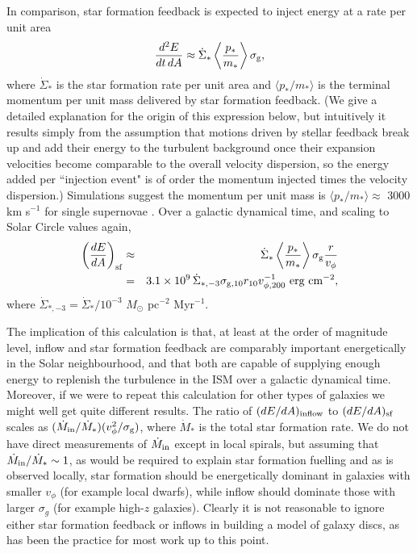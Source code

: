 \documentclass[useAMS,usenatbib]{mn2e}
\begin{document}
In comparison, star formation feedback is expected to inject energy at a rate per unit area 
\begin{equation}
\frac{d^2 E}{dt\, dA} \approx \dot{\Sigma}_* \left\langle \frac{p_*}{m_*}\right\rangle \sigma_{\rm g},
\end{equation}
where $\dot{\Sigma}_*$ is the star formation rate per unit area and $\langle p_*/m_*\rangle$ is the terminal momentum per unit mass delivered by star formation feedback. (We give a detailed explanation for the origin of this expression below, but intuitively it results simply from the assumption that motions driven by stellar feedback break up and add their energy to the turbulent background once their expansion velocities become comparable to the overall velocity dispersion, so the energy added per ``injection event" is of order the momentum injected times the velocity dispersion.)  Simulations suggest the momentum per unit mass is $\langle p_*/m_*\rangle \approx$ 3000 km s$^{-1}$ for single supernovae \citep{cioffi88a, thornton98a, martizzi15a, kim15a, walch15b, gentry17a, kim17a}. Over a galactic dynamical time, and scaling to Solar Circle values again,
\begin{eqnarray}
\left(\frac{dE}{dA}\right)_{\rm sf} & \approx & \dot{\Sigma}_* \left\langle \frac{p_*}{m_*}\right\rangle \sigma_{\rm g} \frac{r}{v_\phi}
\nonumber \\
& = & 3.1\times 10^9\, \dot{\Sigma}_{*,-3} \sigma_{\rm g,10} r_{10} v_{\phi,200}^{-1}\mbox{ erg cm}^{-2},
\end{eqnarray}
where $\dot{\Sigma}_{*,-3} = \dot{\Sigma}_* / 10^{-3}$ $M_\odot$ pc$^{-2}$ Myr$^{-1}$.

The implication of this calculation is that, at least at the order of magnitude level, inflow and star formation feedback are comparably important energetically in the Solar neighbourhood, and that both are capable of supplying enough energy to replenish the turbulence in the ISM over a galactic dynamical time. Moreover, if we were to repeat this calculation for other types of galaxies we might well get quite different results. The ratio of $(dE/dA)_{\rm inflow}$ to $(dE/dA)_{\rm sf}$ scales as $(\dot{M}_{\rm in}/\dot{M}_*) (v_\phi^2/\sigma_{\rm g})$, where $\dot{M}_*$ is the total star formation rate. We do not have direct measurements of $\dot{M}_{\rm in}$ except in local spirals, but assuming that $\dot{M}_{\rm in}/\dot{M}_* \sim 1$, as would be required to explain star formation fuelling and as is observed locally, star formation should be energetically dominant in galaxies with smaller $v_\phi$ (for example local dwarfs), while inflow should dominate those with larger $\sigma_g$ (for example high-$z$ galaxies). Clearly it is not reasonable to ignore either star formation feedback or inflows in building a model of galaxy discs, as has been the practice for most work up to this point. 
\end{document}
